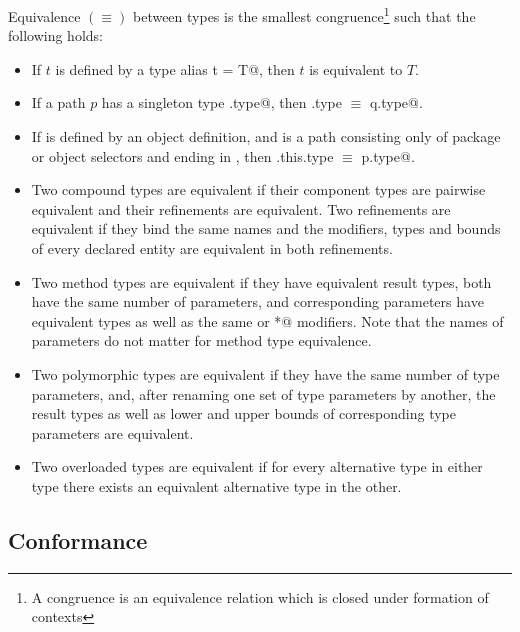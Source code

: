 \documentclass[11pt]{report}
\begin{document}
Equivalence $(\equiv)$ between types is the smallest congruence\footnote{ A
congruence is an equivalence relation which is closed under formation
of contexts} such that the following holds:
\begin{itemize}
\item 
If $t$ is defined by a type alias \verb@type t = T@, then $t$ is
equivalent to $T$.
\item
If a path $p$ has a singleton type \verb@q.type@, then
\verb@p.type $\equiv$ q.type@.
\item
If \verb@O@ is defined by an object definition, and \verb@p@ is a path
consisting only of package or object selectors and ending in \verb@O@, then
\verb@O.this.type $\equiv$ p.type@.
\item
Two compound types are equivalent if their component types are
pairwise equivalent and their refinements are equivalent. Two
refinements are equivalent if they bind the same names and the
modifiers, types and bounds of every declared entity are equivalent in
both refinements.
\item
Two method types are equivalent if they have equivalent result
types, both have the same number of parameters, and corresponding
parameters have equivalent types as well as the same \verb@def@ or
\verb@*@ modifiers.  Note that the names of parameters do not matter
for method type equivalence.
\item
Two polymorphic types are equivalent if they have the same number of
type parameters, and, after renaming one set of type parameters by
another, the result types as well as lower and upper bounds of
corresponding type parameters are equivalent.
\item
Two overloaded types are equivalent if for every alternative type in
either type there exists an equivalent alternative type in the other.
\end{itemize}

\subsection{Conformance}
\label{sec:subtyping}
\end{document}
